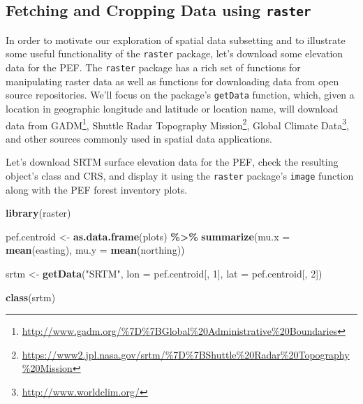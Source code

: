 \documentclass[
]{krantz}
\newenvironment{Shaded}{\begin{snugshade}}{\end{snugshade}}
\newcommand{\DataTypeTok}[1]{\textcolor[rgb]{0.13,0.29,0.53}{#1}}
\newcommand{\DecValTok}[1]{\textcolor[rgb]{0.00,0.00,0.81}{#1}}
\newcommand{\KeywordTok}[1]{\textcolor[rgb]{0.13,0.29,0.53}{\textbf{#1}}}
\newcommand{\NormalTok}[1]{#1}
\newcommand{\OperatorTok}[1]{\textcolor[rgb]{0.81,0.36,0.00}{\textbf{#1}}}
\newcommand{\StringTok}[1]{\textcolor[rgb]{0.31,0.60,0.02}{#1}}
\renewcommand{\href}[2]{#2\footnote{\url{#1}}}
\begin{document}
\hypertarget{fetching-and-cropping-data-using-raster}{%
\subsection{\texorpdfstring{Fetching and Cropping Data using \texttt{raster}}{Fetching and Cropping Data using raster}}\label{fetching-and-cropping-data-using-raster}}

In order to motivate our exploration of spatial data subsetting and to illustrate some useful functionality of the \texttt{raster} package, let's download some elevation data for the PEF. The \texttt{raster} package has a rich set of functions for manipulating raster data as well as functions for downloading data from open source repositories. We'll focus on the package's \texttt{getData} function, which, given a location in geographic longitude and latitude or location name, will download data from \href{http://www.gadm.org/\%7D\%7BGlobal\%20Administrative\%20Boundaries}{GADM}, \href{https://www2.jpl.nasa.gov/srtm/\%7D\%7BShuttle\%20Radar\%20Topography\%20Mission}{Shuttle Radar Topography Mission}, \href{http://www.worldclim.org/}{Global Climate Data}, and other sources commonly used in spatial data applications.

Let's download SRTM surface elevation data for the PEF, check the resulting object's class and CRS, and display it using the \texttt{raster} package's \texttt{image} function along with the PEF forest inventory plots.

\begin{Shaded}
\begin{Highlighting}[]
\KeywordTok{library}\NormalTok{(raster)}

\NormalTok{pef.centroid \textless{}{-}}\StringTok{ }\KeywordTok{as.data.frame}\NormalTok{(plots) }\OperatorTok{\%\textgreater{}\%}\StringTok{ }
\StringTok{    }\KeywordTok{summarize}\NormalTok{(}\DataTypeTok{mu.x =} \KeywordTok{mean}\NormalTok{(easting), }\DataTypeTok{mu.y =} \KeywordTok{mean}\NormalTok{(northing))}

\NormalTok{srtm \textless{}{-}}\StringTok{ }\KeywordTok{getData}\NormalTok{(}\StringTok{"SRTM"}\NormalTok{, }\DataTypeTok{lon =}\NormalTok{ pef.centroid[, }\DecValTok{1}\NormalTok{], }\DataTypeTok{lat =}\NormalTok{ pef.centroid[, }\DecValTok{2}\NormalTok{])}
\end{Highlighting}
\end{Shaded}

\begin{Shaded}
\begin{Highlighting}[]
\KeywordTok{class}\NormalTok{(srtm)}
\end{Highlighting}
\end{Shaded}
\end{document}
